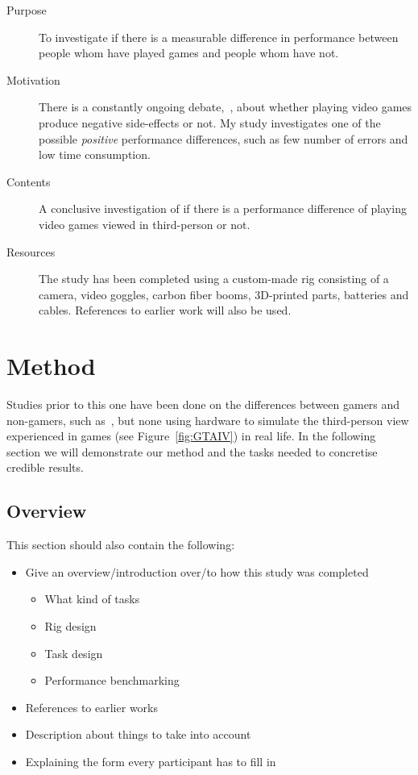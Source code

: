 \documentclass[runningheads,a4paper,oribibl]{llncs}
\begin{document}
\begin{description}
   \item[Purpose] To investigate if there is a measurable difference in performance between people whom have played games and people whom have not.
   \item[Motivation] There is a constantly ongoing debate,~\cite{valadez2012just}, about whether playing video games produce negative side-effects or not. My study investigates one of the possible \emph{positive} performance differences, such as few number of errors and low time consumption.
   \item[Contents] A conclusive investigation of if there is a performance difference of playing video games viewed in third-person or not.
   \item[Resources] The study has been completed using a custom-made rig consisting of a camera, video goggles, carbon fiber booms, 3D-printed parts, batteries and cables. References to earlier work will also be used.
\end{description}








\section{Method}
Studies prior to this one have been done on the differences between gamers and non-gamers, such as~\cite{schmierbach2011exploring}, but none using hardware to simulate the third-person view experienced in games (see Figure~\ref{fig:GTAIV}) in real life. In the following section we will demonstrate our method and the tasks needed to concretise credible results.

\subsection{Overview}

This section should also contain the following:
\begin{itemize}
	\item Give an overview/introduction over/to how this study was completed
	\begin{itemize}
		\item What kind of tasks
		\item Rig design
		\item Task design
		\item Performance benchmarking
	\end{itemize}
	\item References to earlier works
	\item Description about things to take into account
	\item Explaining the form every participant has to fill in
\end{itemize}
\end{document}
